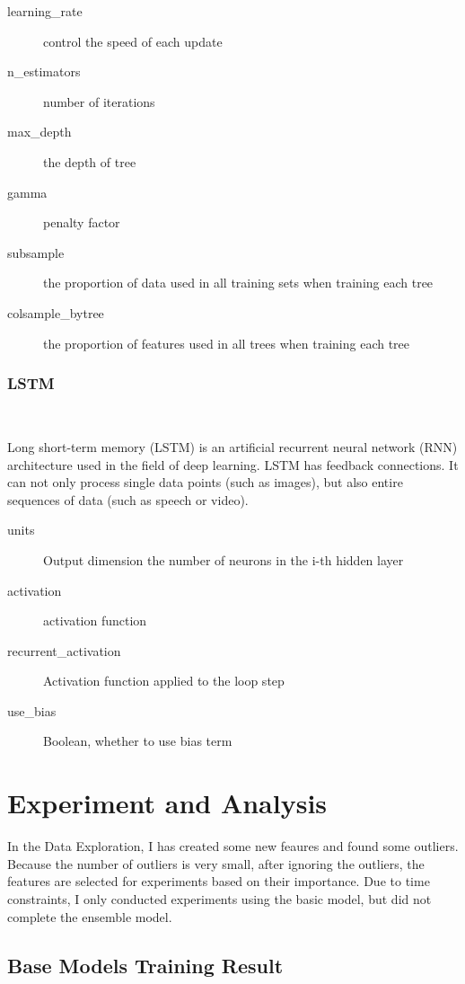 \begin{description}
	\item[learning_rate]  control the speed of each update
	\item[n_estimators] number of iterations
	\item[max_depth] the depth of tree
	\item[gamma] penalty factor%
	\item[subsample] the proportion of data used in 
		all training sets when training each tree
	\item[colsample_bytree] the proportion of features used 
		in all trees when training each tree
	\end{description}

\subsubsection{LSTM}
\

Long short-term memory (LSTM) is an artificial recurrent neural network (RNN) 
architecture used in the field of deep learning. LSTM has feedback connections. 
It can not only process single data points (such as images), but also entire 
sequences of data (such as speech or video). 
	
	
\begin{description}
	\item[units] Output dimension 
		the number of neurons in the i-th hidden layer
	\item[activation] activation function
	\item[recurrent_activation] Activation function applied to the loop step
	\item[use_bias] Boolean, whether to use bias term
\end{description}



\section{Experiment and Analysis}

In the Data Exploration, 
I has created some new feaures 
and found some outliers.
Because the number of outliers is very small, 
after ignoring the outliers, the features 
are selected for experiments based on their importance.
Due to time constraints, I only conducted 
experiments using the basic model, but 
did not complete the ensemble model.

\subsection{Base Models Training Result}

